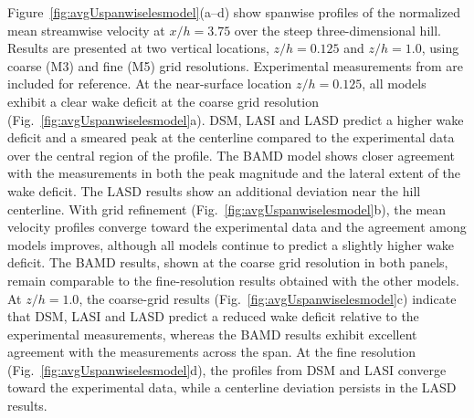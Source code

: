\documentclass[%
superscriptaddress,
 amsmath,amssymb,
pra,
showkeys,
]{revtex4-2}
\begin{document}
Figure~\ref{fig:avgUspanwiselesmodel}(a--d) show spanwise profiles of the normalized mean streamwise velocity at $x/h = 3.75$ over the steep three-dimensional hill. Results are presented at two vertical locations, $z/h = 0.125$ and $z/h = 1.0$, using coarse (M3) and fine (M5) grid resolutions. Experimental measurements from \citet{ishihara1999wind} are included for reference. At the near-surface location $z/h = 0.125$, all models exhibit a clear wake deficit at the coarse grid resolution (Fig.~\ref{fig:avgUspanwiselesmodel}a). DSM, LASI and LASD predict a higher wake deficit and a smeared peak at the centerline compared to the experimental data over the central region of the profile. The BAMD model shows closer agreement with the measurements in both the peak magnitude and the
lateral extent of the wake deficit. The LASD results show an additional deviation near the hill centerline. With grid refinement (Fig.~\ref{fig:avgUspanwiselesmodel}b), the mean velocity profiles converge toward the experimental data and the agreement among models improves, although all models continue to predict a slightly higher wake deficit. The BAMD results, shown at the coarse grid resolution in both panels, remain comparable to the fine-resolution results obtained with the other models. At $z/h = 1.0$, the coarse-grid results (Fig.~\ref{fig:avgUspanwiselesmodel}c) indicate that DSM, LASI and LASD predict a reduced wake deficit relative to the experimental measurements, whereas the BAMD results exhibit excellent agreement with the measurements across the span. At the fine resolution (Fig.~\ref{fig:avgUspanwiselesmodel}d), the profiles from DSM and LASI converge toward the experimental data, while a centerline deviation persists in the LASD results.
\end{document}
